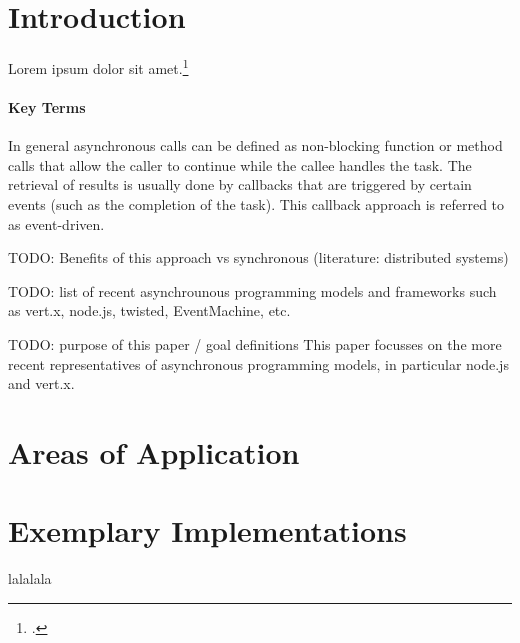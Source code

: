 

\title{\papertitle}
\author{Rocco Schulz, Max Vökler, Joe Boden,\\ Robert Wawrzyniak, Can Paul Bineytioglu\\\\
	Corporate State University\\Baden-Wuerttemberg - Stuttgart}

\date{\today}



\maketitle


\begin{abstract}
This paper evaluates asynchronous server technologies. Strenghts and weaknesses
of asynchronous programming models are alaborated and a proof of concept 
based on node.js and vert.x is used to evaluate non-functional attributes such as
maintainability. \ldots
\end{abstract}

\section{Introduction}
Lorem ipsum dolor sit amet.\footcite[Cf.][30]{fettig_2005}

\paragraph{Key Terms}
In general asynchronous calls can be defined as non-blocking function or method calls that allow the caller to continue while the callee handles the task.
The retrieval of results is usually done by callbacks that are triggered by certain events (such as the completion of the task). This callback approach is referred to as event-driven.

TODO: Benefits of this approach vs synchronous (literature: distributed systems)

TODO: list of recent asynchrounous programming models and frameworks such as vert.x, node.js, twisted, EventMachine, etc.

TODO: purpose of this paper / goal definitions
This paper focusses on the more recent representatives of asynchronous programming models, in particular node.js and vert.x. 


\section{Areas of Application} \label{areas_of_application}




\section{Exemplary Implementations} \label{exemplary_implementations}

lalalala

